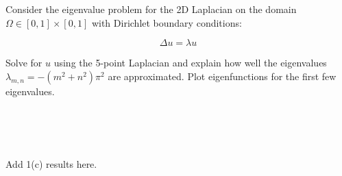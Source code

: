 Consider the eigenvalue problem for the 2D Laplacian on the domain $\Omega \in [0, 1] \times [0, 1]$ with Dirichlet
boundary conditions:

$$
\Delta u = \lambda u
$$

Solve for $u$ using the 5-point Laplacian and explain how well the eigenvalues $\lambda_{m,n} = -(m^2 + n^2)\pi^2$ are
approximated. Plot eigenfunctions for the first few eigenvalues.

\begin{solution}\ \\\\
    \ \\
    \newpage

    Add 1(c) results here.
\end{solution}